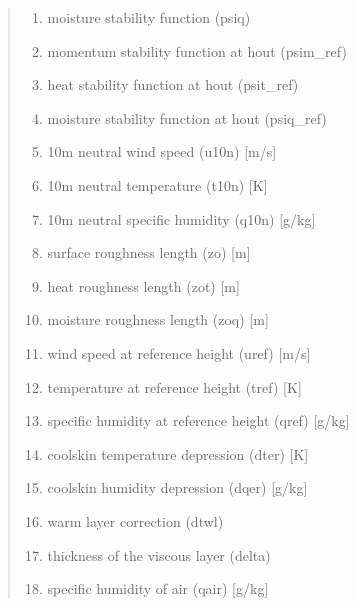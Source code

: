 \documentclass[letterpaper,10pt,english]{sphinxmanual}
\begin{document}
\begin{fulllineitems}
\begin{quote}
\begin{description}
\begin{enumerate}
\item {}
\sphinxAtStartPar
moisture stability function (psiq)

\item {}
\sphinxAtStartPar
momentum stability function at hout (psim\_ref)

\item {}
\sphinxAtStartPar
heat stability function at hout (psit\_ref)

\item {}
\sphinxAtStartPar
moisture stability function at hout (psiq\_ref)

\item {}
\sphinxAtStartPar
10m neutral wind speed (u10n) {[}m/s{]}

\item {}
\sphinxAtStartPar
10m neutral temperature (t10n) {[}K{]}

\item {}
\sphinxAtStartPar
10m neutral specific humidity (q10n) {[}g/kg{]}

\item {}
\sphinxAtStartPar
surface roughness length (zo) {[}m{]}

\item {}
\sphinxAtStartPar
heat roughness length (zot) {[}m{]}

\item {}
\sphinxAtStartPar
moisture roughness length (zoq) {[}m{]}

\item {}
\sphinxAtStartPar
wind speed at reference height (uref) {[}m/s{]}

\item {}
\sphinxAtStartPar
temperature at reference height (tref) {[}K{]}

\item {}
\sphinxAtStartPar
specific humidity at reference height (qref) {[}g/kg{]}

\item {}
\sphinxAtStartPar
cool\sphinxhyphen{}skin temperature depression (dter) {[}K{]}

\item {}
\sphinxAtStartPar
cool\sphinxhyphen{}skin humidity depression (dqer) {[}g/kg{]}

\item {}
\sphinxAtStartPar
warm layer correction (dtwl)

\item {}
\sphinxAtStartPar
thickness of the viscous layer (delta)

\item {}
\sphinxAtStartPar
specific humidity of air (qair) {[}g/kg{]}


\end{enumerate}
\end{description}
\end{quote}
\end{fulllineitems}
\end{document}
